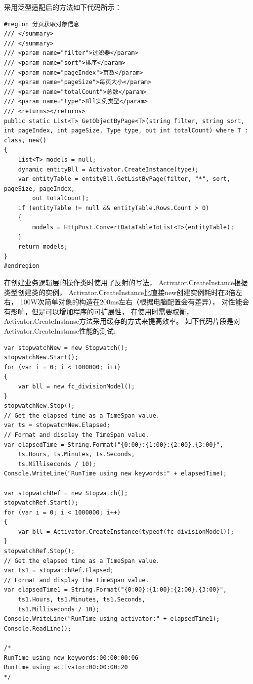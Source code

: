 \documentclass{book}
\begin{document}
采用泛型适配后的方法如下代码所示：

\begin{lstlisting}[language={[Sharp]C},caption=泛型查询方法适配所有对象的分页查询]
#region 分页获取对象信息
/// </summary>
/// </summary>
/// <param name="filter">过滤器</param>
/// <param name="sort">排序</param>
/// <param name="pageIndex">页数</param>
/// <param name="pageSize">每页大小</param>
/// <param name="totalCount">总数</param>
/// <param name="type">Bll实例类型</param>
/// <returns></returns>
public static List<T> GetObjectByPage<T>(string filter, string sort, int pageIndex, int pageSize, Type type, out int totalCount) where T : class, new()
{
    List<T> models = null;
    dynamic entityBll = Activator.CreateInstance(type);
    var entityTable = entityBll.GetListByPage(filter, "*", sort, pageSize, pageIndex,
        out totalCount);
    if (entityTable != null && entityTable.Rows.Count > 0)
    {
        models = HttpPost.ConvertDataTableToList<T>(entityTable);
    }
    return models;
}
#endregion
\end{lstlisting}

在创建业务逻辑层的操作类时使用了反射的写法，
Activator.CreateInstance根据类型创建类的实例，
Activator.CreateInstance比直接new创建实例耗时在3倍左右，
100W次简单对象的构造在200ms左右（根据电脑配置会有差异），
对性能会有影响，但是可以增加程序的可扩展性，
在使用时需要权衡，Activator.CreateInstanse方法采用缓存的方式来提高效率。
如下代码片段是对Activator.CreateInstanse性能的测试:

\begin{lstlisting}[language={[Sharp]C}]
var stopwatchNew = new Stopwatch();
stopwatchNew.Start();
for (var i = 0; i < 1000000; i++)
{
    var bll = new fc_divisionModel();
}
stopwatchNew.Stop();
// Get the elapsed time as a TimeSpan value.
var ts = stopwatchNew.Elapsed;
// Format and display the TimeSpan value.
var elapsedTime = String.Format("{0:00}:{1:00}:{2:00}.{3:00}",
    ts.Hours, ts.Minutes, ts.Seconds,
    ts.Milliseconds / 10);
Console.WriteLine("RunTime using new keywords:" + elapsedTime);

var stopwatchRef = new Stopwatch();
stopwatchRef.Start();
for (var i = 0; i < 1000000; i++)
{
    var bll = Activator.CreateInstance(typeof(fc_divisionModel));
}
stopwatchRef.Stop();
// Get the elapsed time as a TimeSpan value.
var ts1 = stopwatchRef.Elapsed;
// Format and display the TimeSpan value.
var elapsedTime1 = String.Format("{0:00}:{1:00}:{2:00}.{3:00}",
    ts1.Hours, ts1.Minutes, ts1.Seconds,
    ts1.Milliseconds / 10);
Console.WriteLine("RunTime using activator:" + elapsedTime1);
Console.ReadLine();

/*
RunTime using new keywords:00:00:00:06
RunTime using activator:00:00:00:20
*/
\end{lstlisting}
\end{document}

